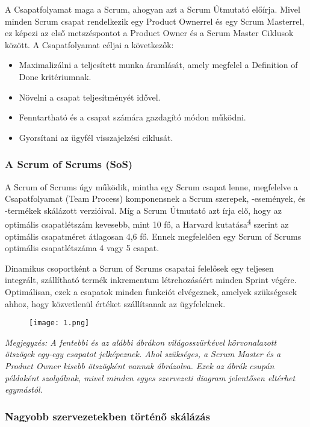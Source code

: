 \documentclass[12pt,a4paper,parskip=full]{scrartcl}
\begin{document}
A Csapatfolyamat maga a Scrum, ahogyan azt a Scrum Útmutató előírja. Mivel minden Scrum csapat rendelkezik egy Product Ownerrel és egy Scrum Masterrel, ez képezi az első metszéspontot a Product Owner és a Scrum Master Ciklusok között. A Csapatfolyamat céljai a következők:

\begin{itemize}
\itemsep1pt\parskip0pt
\item
 Maximalizálni a teljesített munka áramlását, amely megfelel a Definition of Done kritériumnak.
\item
 Növelni a csapat teljesítményét idővel.
\item
 Fenntartható és a csapat számára gazdagító módon működni.
\item
 Gyorsítani az ügyfél visszajelzési ciklusát.
\end{itemize}

\subsubsection{A Scrum of Scrums (SoS)}\label{the-scrum-of-scrums}
A Scrum of Scrums úgy működik, mintha egy Scrum csapat lenne, megfelelve a Csapatfolyamat (Team Process) komponensnek a Scrum szerepek, -események, és -termékek skálázott verzióival. Míg a Scrum Útmutató azt írja elő, hogy az optimális csapatlétszám kevesebb, mint 10 fő, a Harvard kutatása\textsuperscript{\hyperref[citation4]{4}} szerint az optimális csapatméret átlagosan 4,6 fő. Ennek megfelelően egy Scrum of Scrums optimális csapatlétszáma 4 vagy 5 csapat.

Dinamikus csoportként a Scrum of Scrums csapatai felelősek egy teljesen integrált, szállítható termék inkrementum létrehozásáért minden Sprint végére. Optimálisan, ezek a csapatok minden funkciót elvégeznek, amelyek szükségesek ahhoz, hogy közvetlenül értéket szállítsanak az ügyfeleknek.

\begin{figure}[H]
    \centering
    \texttt{[image: 1.png]}
\end{figure}


\emph{
Megjegyzés: A fentebbi és az alábbi ábrákon világosszürkével körvonalazott ötszögek egy-egy csapatot jelképeznek. Ahol szükséges, a Scrum Master és a Product Owner kisebb ötszögként vannak ábrázolva. Ezek az ábrák csupán példaként szolgálnak, mivel minden egyes szervezeti diagram jelentősen eltérhet egymástól.
}

\subsubsection{Nagyobb szervezetekben történő skálázás}\label{scaling-in-larger-organizations}
\end{document}
